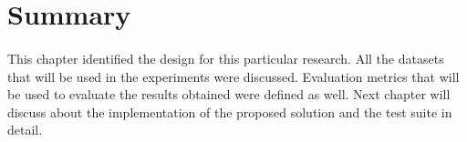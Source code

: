 \section{Summary}
\label{section:design_summary}

\paragraph{}
This chapter identified the design for this particular research. All the datasets that will be used in the experiments were discussed. Evaluation metrics that will be used to evaluate the results obtained were defined as well. Next chapter will discuss about the implementation of the proposed solution and the test suite in detail.